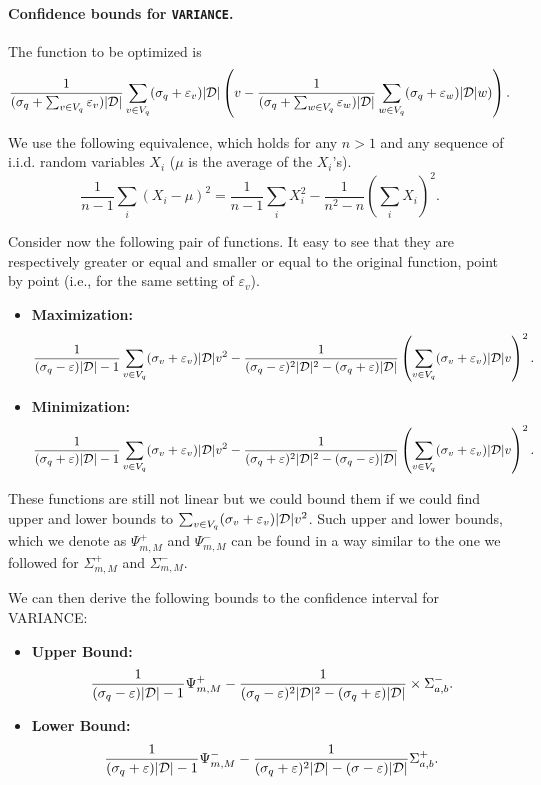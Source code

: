 \paragraph{Confidence bounds for \texttt{VARIANCE}.} 
The function to be optimized is 
\[
\frac{1}{(\sigma_q+\sum_{v\in V_q}\varepsilon_v)|{\cal D}|}\sum_{v\in
V_q}(\sigma_q+\varepsilon_v)|{\cal D}|\left(v - \frac{1}{(\sigma_q+\sum_{w\in
V_q}\varepsilon_w)|{\cal D}|}\sum_{w\in V_q}(\sigma_q+\varepsilon_w)|{\cal D}|w)\right).\]

We use the following equivalence, which holds for any $n>1$ and any sequence of i.i.d. random
variables $X_i$ ($\mu$ is the average of the $X_i$'s).
\[
\frac{1}{n-1}\sum_i(X_i-\mu)^2=\frac{1}{n-1}\sum_iX_i^2-\frac{1}{n^2-n}\left(\sum_iX_i\right)^2.\]

Consider now the following pair of functions. It easy to see that they are
respectively greater or equal and smaller or equal to the original function,
point by point (i.e., for the same setting of $\varepsilon_v$).
\begin{itemize}
  \item {\bf Maximization:}
    \[\frac{1}{(\sigma_q-\varepsilon)|{\cal D}|-1}\sum_{v\in
    V_q}(\sigma_v+\varepsilon_v)|{\cal D}|v^2-\frac{1}{(\sigma_q-\varepsilon)^2|{\cal D}|^2-(\sigma_q+\varepsilon)|{\cal D}|}\left(\sum_{v\in
    V_q}(\sigma_v+\varepsilon_v)|{\cal D}|v\right)^2.\]
  \item {\bf Minimization:} 
    \[\frac{1}{(\sigma_q+\varepsilon)|{\cal D}|-1}\sum_{v\in
    V_q}(\sigma_v+\varepsilon_v)|{\cal D}|v^2-\frac{1}{(\sigma_q+\varepsilon)^2|{\cal D}|^2-(\sigma_q-\varepsilon)|{\cal D}|}\left(\sum_{v\in
    V_q}(\sigma_v+\varepsilon_v)|{\cal D}|v\right)^2.\]
\end{itemize}

These functions are still not linear but we could bound them if we could find
upper and lower bounds to $\sum_{v\in V_q}(\sigma_v+\varepsilon_v)|{\cal D}|v^2$. Such
upper and lower bounds, which we denote as $\Psi^+_{m,M}$ and $\Psi^-_{m,M}$ can
be found in a way similar to the one we followed for $\Sigma^+_{m,M}$ and
$\Sigma^-_{m,M}$. 

We can then derive the following bounds to the confidence interval for VARIANCE:
\begin{itemize}
  \item{\bf Upper Bound:}
\[
\frac{1}{(\sigma_q-\varepsilon)|{\cal D}|-1}\Psi^+_{m,M}-\frac{1}{(\sigma_q-\varepsilon)^2|{\cal D}|^2-(\sigma_q+\varepsilon)|{\cal D}|}\times
\Sigma^-_{a,b}.\]

  \item{\bf Lower Bound:}
\[
\frac{1}{(\sigma_q+\varepsilon)|{\cal D}|-1}\Psi^-_{m,M}-\frac{1}{(\sigma_q+\varepsilon)^2|{\cal D}|-(\sigma-\varepsilon)|{\cal D}|} \Sigma^+_{a,b}.\]
\end{itemize}

